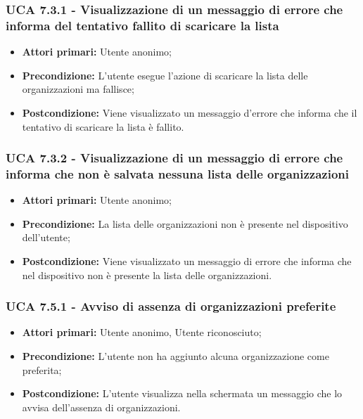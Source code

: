 \subsubsection{UCA 7.3.1 - Visualizzazione di un messaggio di errore che informa del tentativo fallito di scaricare la lista}%
\begin{itemize}
\item \textbf{Attori primari:} Utente anonimo;
\item \textbf{Precondizione:} L'utente esegue l'azione di scaricare la lista delle organizzazioni ma fallisce;
\item \textbf{Postcondizione:} Viene visualizzato un messaggio d'errore che informa che il tentativo di scaricare la lista è fallito.

\end{itemize}

\subsubsection{UCA 7.3.2 - Visualizzazione di un messaggio di errore che informa che non è salvata nessuna lista delle organizzazioni}%
\begin{itemize}
	\item \textbf{Attori primari:} Utente anonimo;
	\item \textbf{Precondizione:} La lista delle organizzazioni non è presente nel dispositivo dell'utente;
	\item \textbf{Postcondizione:} Viene visualizzato un messaggio di errore che informa che nel dispositivo non è presente la lista delle organizzazioni.
\end{itemize}

\subsubsection{UCA 7.5.1 - Avviso di assenza di organizzazioni preferite}
\begin{itemize}
    \item \textbf{Attori primari:} Utente anonimo, Utente riconosciuto;
    \item \textbf{Precondizione:} L'utente non ha aggiunto alcuna organizzazione come preferita;
    \item \textbf{Postcondizione:} L'utente visualizza nella schermata un messaggio che lo avvisa dell'assenza di organizzazioni.
\end{itemize}

